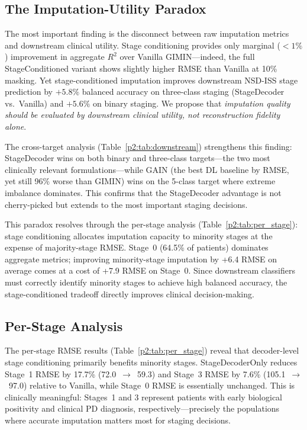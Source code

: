 \subsection{The Imputation-Utility Paradox}

The most important finding is the disconnect between raw imputation metrics and downstream clinical utility. Stage conditioning provides only marginal ($< 1\%$) improvement in aggregate $R^2$ over Vanilla GIMIN---indeed, the full StageConditioned variant shows slightly higher RMSE than Vanilla at 10\% masking. Yet stage-conditioned imputation improves downstream NSD-ISS stage prediction by $+5.8\%$ balanced accuracy on three-class staging (StageDecoder vs.\ Vanilla) and $+5.6\%$ on binary staging. We propose that \textit{imputation quality should be evaluated by downstream clinical utility, not reconstruction fidelity alone}.

The cross-target analysis (Table~\ref{p2:tab:downstream}) strengthens this finding: StageDecoder wins on both binary and three-class targets---the two most clinically relevant formulations---while GAIN (the best DL baseline by RMSE, yet still 96\% worse than GIMIN) wins on the 5-class target where extreme imbalance dominates. This confirms that the StageDecoder advantage is not cherry-picked but extends to the most important staging decisions.

This paradox resolves through the per-stage analysis (Table~\ref{p2:tab:per_stage}): stage conditioning allocates imputation capacity to minority stages at the expense of majority-stage RMSE. Stage~0 (64.5\% of patients) dominates aggregate metrics; improving minority-stage imputation by +6.4 RMSE on average comes at a cost of +7.9 RMSE on Stage~0. Since downstream classifiers must correctly identify minority stages to achieve high balanced accuracy, the stage-conditioned tradeoff directly improves clinical decision-making.

\subsection{Per-Stage Analysis}

The per-stage RMSE results (Table~\ref{p2:tab:per_stage}) reveal that decoder-level stage conditioning primarily benefits minority stages. StageDecoderOnly reduces Stage~1 RMSE by 17.7\% (72.0~$\rightarrow$~59.3) and Stage~3 RMSE by 7.6\% (105.1~$\rightarrow$~97.0) relative to Vanilla, while Stage~0 RMSE is essentially unchanged. This is clinically meaningful: Stages~1 and 3 represent patients with early biological positivity and clinical PD diagnosis, respectively---precisely the populations where accurate imputation matters most for staging decisions.


